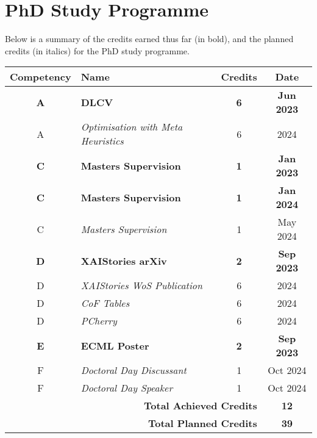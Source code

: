 \section{PhD Study Programme}

Below is a summary of the credits earned thus far (in bold), and the planned credits (in italics) for 
the PhD study programme.

\begin{tabular}{|c|l|c|c|}
    \hline
    \textbf{Competency} & \textbf{Name}                   & \textbf{Credits} & \textbf{Date}   \\ \hline
    \textbf{A}          & \textbf{DLCV}                   & \textbf{6}       & \textbf{Jun 2023} \\ \hline
    A                   & \textit{Optimisation with Meta Heuristics} & 6      & 2024           \\ \hline
    \textbf{C}          & \textbf{Masters Supervision}    & \textbf{1}       & \textbf{Jan 2023} \\ \hline
    \textbf{C}          & \textbf{Masters Supervision}    & \textbf{1}       & \textbf{Jan 2024} \\ \hline
    C                   & \textit{Masters Supervision}    & 1                & May 2024         \\ \hline
    \textbf{D}          & \textbf{XAIStories arXiv}       & \textbf{2}       & \textbf{Sep 2023} \\ \hline
    D                   & \textit{XAIStories WoS Publication} & 6            & 2024           \\ \hline
    D                   & \textit{CoF Tables}             & 6                & 2024           \\ \hline
    D                   & \textit{PCherry}                & 6                & 2024           \\ \hline
    \textbf{E}          & \textbf{ECML Poster}            & \textbf{2}       & \textbf{Sep 2023} \\ \hline
    F                   & \textit{Doctoral Day Discussant} & 1                & Oct 2024         \\ \hline
    F                   & \textit{Doctoral Day Speaker}   & 1                & Oct 2024         \\ \hline
    \multicolumn{3}{|r|}{\textbf{Total Achieved Credits}} & \textbf{12}      \\ \hline
    \multicolumn{3}{|r|}{\textbf{Total Planned Credits}}  & \textbf{39}      \\ \hline
\end{tabular}

